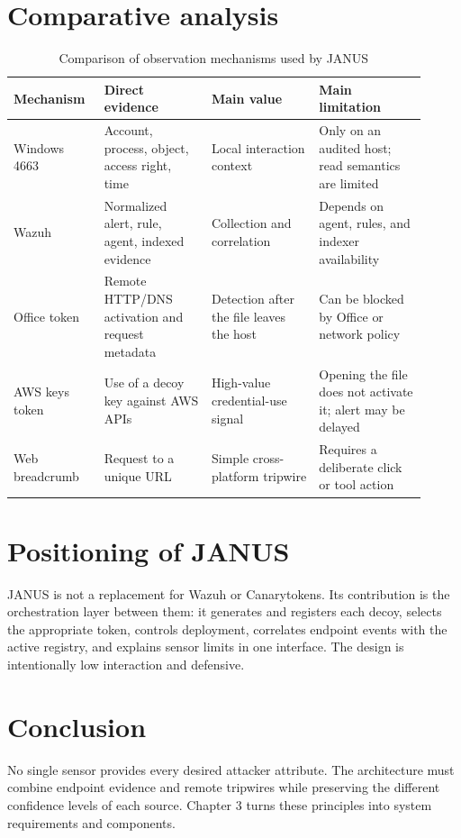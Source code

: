 \section{Comparative analysis}

\begin{table}[H]
\centering
\caption{Comparison of observation mechanisms used by JANUS}
\label{tab:mechanism-comparison}
\small
\begin{tabular}{p{0.19\linewidth}p{0.24\linewidth}p{0.24\linewidth}p{0.24\linewidth}}
\toprule
Mechanism & Direct evidence & Main value & Main limitation \\
\midrule
Windows 4663 & Account, process, object, access right, time & Local interaction context & Only on an audited host; read semantics are limited \\
Wazuh & Normalized alert, rule, agent, indexed evidence & Collection and correlation & Depends on agent, rules, and indexer availability \\
Office token & Remote HTTP/DNS activation and request metadata & Detection after the file leaves the host & Can be blocked by Office or network policy \\
AWS keys token & Use of a decoy key against AWS APIs & High-value credential-use signal & Opening the file does not activate it; alert may be delayed \\
Web breadcrumb & Request to a unique URL & Simple cross-platform tripwire & Requires a deliberate click or tool action \\
\bottomrule
\end{tabular}
\end{table}

\section{Positioning of JANUS}

JANUS is not a replacement for Wazuh or Canarytokens. Its contribution is the
orchestration layer between them: it generates and registers each decoy,
selects the appropriate token, controls deployment, correlates endpoint events
with the active registry, and explains sensor limits in one interface. The
design is intentionally low interaction and defensive.

\section{Conclusion}

No single sensor provides every desired attacker attribute. The architecture
must combine endpoint evidence and remote tripwires while preserving the
different confidence levels of each source. Chapter 3 turns these principles
into system requirements and components.

